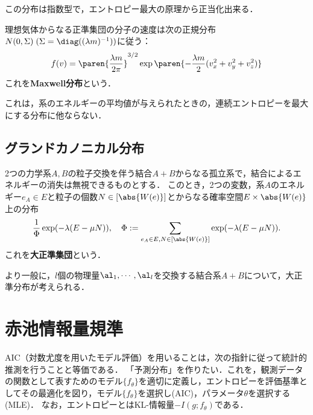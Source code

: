 \documentclass[uplatex,dvipdfmx]{jsreport}
\begin{document}
\begin{remarks}
    この分布は指数型で，エントロピー最大の原理から正当化出来る．
\end{remarks}

\begin{proposition}
    理想気体からなる正準集団の分子の速度は次の正規分布$N(0,\Sigma)\;(\Sigma=\diag((\lambda m)^{-1}))$に従う：
    \[f(v)=\paren{\frac{\lambda m}{2\pi}}^{3/2}\exp\paren{-\frac{\lambda m}{2}(v^2_x+v^2_y+v^2_z)}\]
    これを\textbf{Maxwell分布}という．
\end{proposition}
\begin{remarks}
    これは，系のエネルギーの平均値が与えられたときの，連続エントロピーを最大にする分布に他ならない．
\end{remarks}

\subsection{グランドカノニカル分布}

\begin{model}
    2つの力学系$A,B$の粒子交換を伴う結合$A+B$からなる孤立系で，結合によるエネルギーの消失は無視できるものとする．
    このとき，2つの変数，系$A$のエネルギー$e_A\in E$と粒子の個数$N\in [\abs{W(e)}]$とからなる確率空間$E\times\abs{W(e)}$上の分布
    \[\frac{1}{\Phi}\exp(-\lambda(E-\mu N)),\quad\Phi:=\sum_{e_A\in E,N\in[\abs{W(e)}]}\exp(-\lambda(E-\mu N)).\]
    これを\textbf{大正準集団}という．
\end{model}
\begin{remark}
    より一般に，$l$個の物理量$\al_1,\cdots,\al_l$を交換する結合系$A+B$について，大正準分布が考えられる．
\end{remark}

\section{赤池情報量規準}

\begin{tcolorbox}[colframe=ForestGreen, colback=ForestGreen!10!white,breakable,colbacktitle=ForestGreen!40!white,coltitle=black,fonttitle=\bfseries\sffamily,
title=]
    AIC（対数尤度を用いたモデル評価）を用いることは，次の指針に従って統計的推測を行うことと等価である\cite{赤池-AIC-数理科学}．
    「予測分布」を作りたい．これを，観測データの関数として表すためのモデル$\{f_\theta\}$を適切に定義し，エントロピーを評価基準としてその最適化を図り，モデル$\{f_\theta\}$を選択し(AIC)，パラメータ$\theta$を選択する(MLE)．
    なお，エントロピーとはKL-情報量$-I(g;f_\theta)$である．
\end{tcolorbox}
\end{document}
